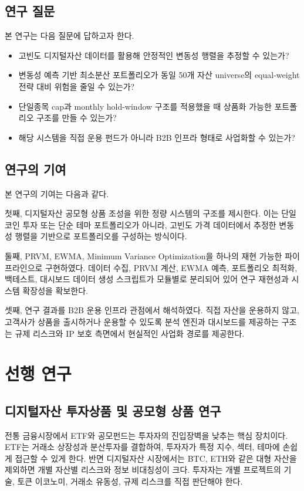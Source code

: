 \documentclass[12pt,a4paper]{article}
\begin{document}
\subsection{연구 질문}

본 연구는 다음 질문에 답하고자 한다.

\begin{itemize}
\item 고빈도 디지털자산 데이터를 활용해 안정적인 변동성 행렬을 추정할 수 있는가?
\item 변동성 예측 기반 최소분산 포트폴리오가 동일 50개 자산 universe의 equal-weight 전략 대비 위험을 줄일 수 있는가?
\item 단일종목 cap과 monthly hold-window 구조를 적용했을 때 상품화 가능한 포트폴리오 구조를 만들 수 있는가?
\item 해당 시스템을 직접 운용 펀드가 아니라 B2B 인프라 형태로 사업화할 수 있는가?
\end{itemize}

\subsection{연구의 기여}

본 연구의 기여는 다음과 같다.

첫째, 디지털자산 공모형 상품 조성을 위한 정량 시스템의 구조를 제시한다. 이는 단일 코인 투자 또는 단순 테마 포트폴리오가 아니라, 고빈도 가격 데이터에서 추정한 변동성 행렬을 기반으로 포트폴리오를 구성하는 방식이다.

둘째, PRVM, EWMA, Minimum Variance Optimization을 하나의 재현 가능한 파이프라인으로 구현하였다. 데이터 수집, PRVM 계산, EWMA 예측, 포트폴리오 최적화, 백테스트, 대시보드 데이터 생성 스크립트가 모듈별로 분리되어 있어 연구 재현성과 시스템 확장성을 확보한다.

셋째, 연구 결과를 B2B 운용 인프라 관점에서 해석하였다. 직접 자산을 운용하지 않고, 고객사가 상품을 출시하거나 운용할 수 있도록 분석 엔진과 대시보드를 제공하는 구조는 규제 리스크와 IP 보호 측면에서 현실적인 사업화 경로를 제공한다.


\section{선행 연구}

\subsection{디지털자산 투자상품 및 공모형 상품 연구}

전통 금융시장에서 ETF와 공모펀드는 투자자의 진입장벽을 낮추는 핵심 장치이다. ETF는 거래소 상장성과 분산투자를 결합하여, 투자자가 특정 지수, 섹터, 테마에 손쉽게 접근할 수 있게 한다. 반면 디지털자산 시장에서는 BTC, ETH와 같은 대형 자산을 제외하면 개별 자산별 리스크와 정보 비대칭성이 크다. 투자자는 개별 프로젝트의 기술, 토큰 이코노미, 거래소 유동성, 규제 리스크를 직접 판단해야 한다.
\end{document}
